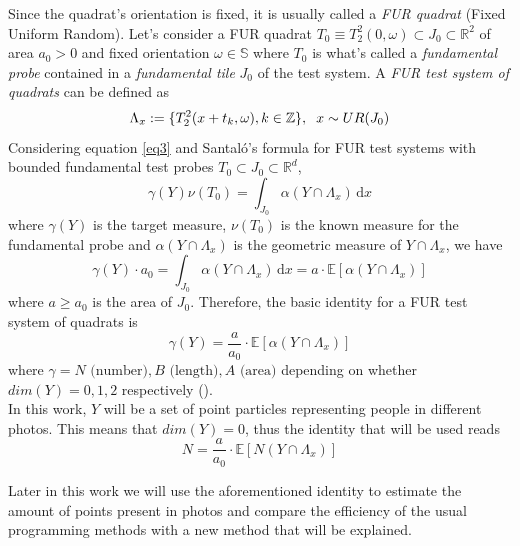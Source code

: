 Since the quadrat's orientation is fixed, it is usually called a \textit{FUR quadrat} (Fixed Uniform Random). Let's consider a FUR quadrat $T_0 \equiv T_2^2(0,\omega) \subset J_0 \subset \mathbb{R}^2$ of area $a_0 > 0$ and fixed orientation $\omega \in \mathbb{S}$ where $T_0$ is what's called a \textit{fundamental probe} contained in a \textit{fundamental tile} $J_0$ of the test system. A \textit{FUR test system of quadrats} can be defined as 
\begin{equation*}
    \Lambda_x := \{ T_2^2(x+t_k,\omega), k\in \mathbb{Z} \}, \hspace{2mm} x \sim UR(J_0)
\end{equation*}
Considering equation \eqref{eq3} and Santaló's formula for FUR test systems with bounded fundamental test probes $T_0\subset J_0\subset \mathbb{R}^d$,
\begin{equation*}
    \gamma(Y)\nu(T_0)=\int_{J_0}  \alpha(Y\cap \Lambda_x)\,\mathrm{d}x
\end{equation*}
where $\gamma(Y)$ is the target measure, $\nu(T_0)$ is the known measure for the fundamental probe and $\alpha(Y\cap \Lambda_x)$ is the geometric measure of $Y\cap \Lambda_x$, we have
\begin{equation*}
    \gamma(Y)\cdot a_0 = \int_{J_0}  \alpha(Y\cap \Lambda_x)\,\mathrm{d}x = a\cdot \mathbb{E}[\alpha(Y\cap \Lambda_x)]
\end{equation*}
where $a\geq a_0$ is the area of $J_0$. Therefore, the basic identity for a FUR test system of quadrats is
\begin{equation} \label{conteo}
    \gamma(Y)=\frac{a}{a_0}\cdot \mathbb{E}[\alpha(Y\cap \Lambda_x)]
\end{equation}
where $\gamma = N \text{ (number)},B \text{ (length)},A \text{ (area)}$ depending on whether $dim(Y)=0,1,2$ respectively (\cite{SterThAppl-2022-07-21.pdf}).\\

In this work, $Y$ will be a set of point particles representing people in different photos. This means that $dim(Y)=0$, thus the identity that will be used reads
\begin{equation} \label{Conteo_usada}
    N =\frac{a}{a_0}\cdot \mathbb{E}[N(Y\cap \Lambda_x)]
\end{equation}

Later in this work we will use the aforementioned identity to estimate the amount of points present in photos and compare the efficiency of the usual programming methods with a new method that will be explained.\\

